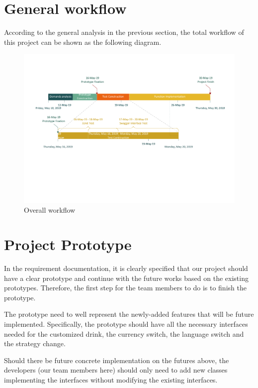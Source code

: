 \documentclass[a4paper]{report}
\begin{document}
\section{General workflow}
According to the general analysis in the previous section, the total workflow of this project can be shown as the following diagram.
\begin{figure}
  \centering
  \includegraphics[scale=0.45]{workFlow.pdf}
  \caption{Overall workflow}\label{1}
\end{figure}

\section{Project Prototype}
In the requirement documentation, it is clearly specified that our project should have a clear prototype and continue with the future works based on the existing prototypes. Therefore, the first step for the team members to do is to finish the prototype. 
\par
The prototype need to well represent the newly-added features that will be future implemented. Specifically, the prototype should have all the necessary interfaces needed for the customized drink, the currency switch, the language switch and the strategy change.
\par
Should there be future concrete implementation on the futures above, the developers (our team members here) should only need to add new classes implementing the interfaces without modifying the existing interfaces.
\end{document}
